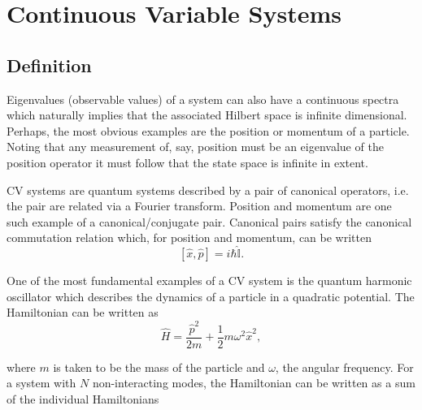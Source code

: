 \documentclass[11pt,a4paper]{article}
\numberwithin{equation}{section}
\begin{document}
	\section{Continuous Variable Systems}
	\label{sec:cvs}
	
	\subsection{Definition}
	Eigenvalues (observable values) of a system can also have a continuous spectra which naturally implies that the associated Hilbert space is infinite dimensional. Perhaps, the most obvious examples are the position or momentum of a particle. Noting that any measurement of, say, position must be an eigenvalue of the position operator it must follow that the state space is infinite in extent. 
	
	CV systems are quantum systems described by a pair of canonical operators, i.e. the pair are related via a Fourier transform. Position and momentum are one such example of a canonical/conjugate pair. Canonical pairs satisfy the canonical commutation relation which, for position and momentum, can be written \cite{Serafini05}
	\begin{equation} \label{eq:6}
	[\hat{x}, \hat{p}] = i\hbar\hat{\mathbb{I}}.
	\end{equation}
	
	One of the most fundamental examples of a CV system is the quantum harmonic oscillator which describes the dynamics of a particle in a quadratic potential. The Hamiltonian can be written as \cite{Adesso14, Braunstein}
	\begin{equation} \label{eq:7}
	\hat{H} = \frac{\hat{p}^2}{2m} + \frac{1}{2} m\omega^2\hat{x}^2,
	\end{equation}
	
	where $m$ is taken to be the mass of the particle and $\omega$, the angular frequency. For a system with $N$ non-interacting modes, the Hamiltonian can be written as a sum of the individual Hamiltonians 
	
\end{document}
